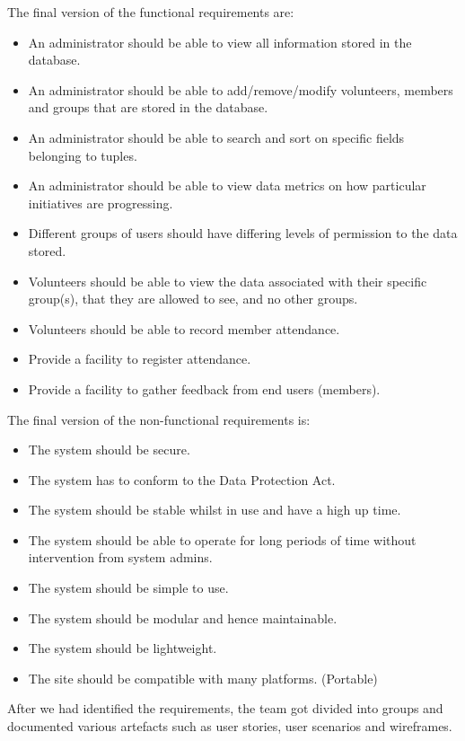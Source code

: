 \documentclass{l3proj}
\begin{document}
The final version of the functional requirements are:
\begin{itemize}
\item An administrator should be able to view all information stored in the database.
\item An administrator should be able to add/remove/modify volunteers, members and groups that are stored in the database.
\item An administrator should be able to search and sort on specific fields belonging to tuples.
\item An administrator should be able to view data metrics on how particular initiatives are progressing.
\item Different groups of users should have differing levels of permission to the data stored.
\item Volunteers should be able to view the data associated with their specific group(s), that they are allowed to see, and no other groups.
\item Volunteers should be able to record member attendance.
\item Provide a facility to register attendance.
\item Provide a facility to gather feedback from end users (members).
\end{itemize}

The final version of the non-functional requirements is:
\begin{itemize}
\item The system should be secure.
\item The system has to conform to the Data Protection Act.
\item The system should be stable whilst in use and have a high up time.
\item The system should be able to operate for long periods of time without intervention from system admins.
\item The system should be simple to use.
\item The system should be modular and hence maintainable.
\item The system should be lightweight.
\item The site should be compatible with many platforms. (Portable)

\end{itemize}

After we had identified the requirements, the team got divided into groups and documented various artefacts such as user stories, user scenarios and wireframes.
\end{document}
